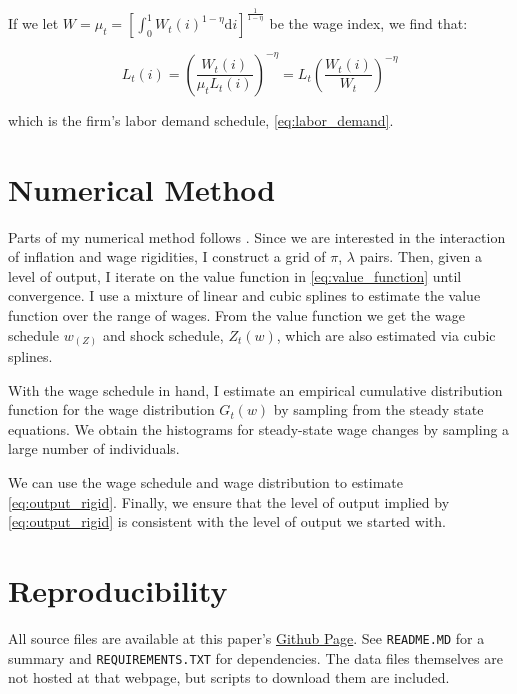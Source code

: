 \documentclass[12pt,a4paper]{scrartcl}            %
\begin{document}
If we let $W = \mu_t = \left[ \int_{0}^{1} \! W_t(i)^{1 - \eta} \mathrm{d}i \right]^{\frac{1}{1 - \eta}}$ be the wage index, we find that:

\begin{equation}
    \label{eqa:firms_foc3}
    L_t(i) = \left(\frac{W_t(i)}{\mu_t L_t(i)}\right)^{-\eta} = L_t \left( \frac{W_t(i)}{W_t} \right)^{-\eta}
\end{equation}

which is the firm's labor demand schedule, \eqref{eq:labor_demand}.
\section{Numerical Method}

Parts of my numerical method follows \cite{daly_hobijn_2013}.
Since we are interested in the interaction of inflation and wage rigidities, I construct a grid of $\pi$, $\lambda$ pairs.
Then, given a level of output, I iterate on the value function in \eqref{eq:value_function} until convergence.
I use a mixture of linear and cubic splines to estimate the value function over the range of wages.
From the value function we get the wage schedule $w_(Z)$ and shock schedule, $Z_t(w)$, which are also estimated via cubic splines.

With the wage schedule in hand, I estimate an empirical cumulative distribution function for the wage distribution $G_t(w)$ by sampling from the steady state equations.
We obtain the histograms for steady-state wage changes by sampling a large number of individuals.

We can use the wage schedule and wage distribution to estimate \eqref{eq:output_rigid}.
Finally, we ensure that the level of output implied by \eqref{eq:output_rigid} is consistent with the level of output we started with.


\section{Reproducibility}

All source files are available at this paper's \href{https://github.com/tomAugspurger/dnwr-zlb}{Github Page}.
See \texttt{README.MD} for a summary and \texttt{REQUIREMENTS.TXT} for dependencies.
The data files themselves are not hosted at that webpage, but scripts to download them are included.
\end{document}
